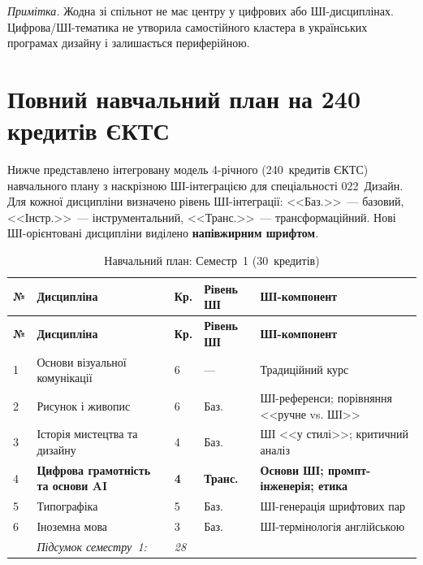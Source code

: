 \textit{Примітка.} Жодна зі спільнот не має центру у цифрових або ШІ-дисциплінах. Цифрова/ШІ-тематика не утворила самостійного кластера в українських програмах дизайну і залишається периферійною.

\clearpage

\section{Повний навчальний план на 240 кредитів ЄКТС}\label{app:curriculum}

Нижче представлено інтегровану модель 4-річного (240~кредитів ЄКТС) навчального плану з наскрізною ШІ-інтеграцією для спеціальності 022~Дизайн. Для кожної дисципліни визначено рівень ШІ-інтеграції: <<Баз.>>~--- базовий, <<Інстр.>>~--- інструментальний, <<Транс.>>~--- трансформаційний. Нові ШІ-орієнтовані дисципліни виділено \textbf{напівжирним шрифтом}.

\begin{longtable}{@{}p{}p{}p{}p{}p{}@{}}
\caption{Навчальний план: Семестр~1 (30~кредитів)}\label{tab:app-sem1} \\
\hline
\textbf{№} & \textbf{Дисципліна} & \textbf{Кр.} & \textbf{Рівень ШІ} & \textbf{ШІ-компонент} \\
\hline
\endfirsthead
\hline
\textbf{№} & \textbf{Дисципліна} & \textbf{Кр.} & \textbf{Рівень ШІ} & \textbf{ШІ-компонент} \\
\hline
\endhead
1 & Основи візуальної комунікації & 6 & --- & Традиційний курс \\
2 & Рисунок і живопис & 6 & Баз. & ШІ-референси; порівняння <<ручне vs. ШІ>> \\
3 & Історія мистецтва та дизайну & 4 & Баз. & ШІ <<у стилі>>; критичний аналіз \\
4 & \textbf{Цифрова грамотність та основи AI} & \textbf{4} & \textbf{Транс.} & \textbf{Основи ШІ; промпт-інженерія; етика} \\
5 & Типографіка & 5 & Баз. & ШІ-генерація шрифтових пар \\
6 & Іноземна мова & 3 & Баз. & ШІ-термінологія англійською \\
\addlinespace
& \textit{Підсумок семестру~1:} & \textit{28} & & \\
\hline
\end{longtable}

